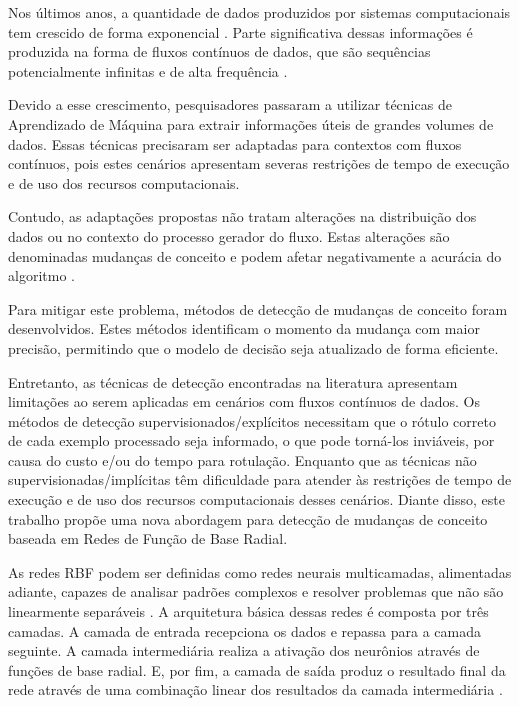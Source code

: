 \documentclass[msc, classic, a4paper]{ufbathesis}
\begin{document}
Nos últimos anos, a quantidade de dados produzidos por sistemas computacionais tem crescido de forma exponencial \cite{idc_report}.
Parte significativa dessas informações é produzida na forma de fluxos contínuos de dados, que são sequências potencialmente infinitas e de alta frequência \cite{Aggarwal:2006:DSM:1196418}.

Devido a esse crescimento, pesquisadores passaram a utilizar técnicas de Aprendizado de Máquina para extrair informações úteis de grandes volumes de dados.
Essas técnicas precisaram ser adaptadas para contextos com fluxos contínuos, pois estes cenários apresentam severas restrições de tempo de execução e de uso dos recursos computacionais.

Contudo, as adaptações propostas não tratam alterações na distribuição dos dados ou no contexto do processo gerador do fluxo.
Estas alterações são denominadas mudanças de conceito e podem afetar negativamente a acurácia do algoritmo \cite{Gama:2014:SCD:2597757.2523813}.

Para mitigar este problema, métodos de detecção de mudanças de conceito foram desenvolvidos.
Estes métodos identificam o momento da mudança com maior precisão, permitindo que o modelo de decisão seja atualizado de forma eficiente.

Entretanto, as técnicas de detecção encontradas na literatura apresentam limitações ao serem aplicadas em cenários com fluxos contínuos de dados.
Os métodos de detecção supervisionados/explícitos necessitam que o rótulo correto de cada exemplo processado seja informado, o que pode torná-los inviáveis, por causa do custo e/ou do tempo para rotulação.
Enquanto que as técnicas não supervisionadas/implícitas têm dificuldade para atender às restrições de tempo de execução e de uso dos recursos computacionais desses cenários.
Diante disso, este trabalho propõe uma nova abordagem para detecção de mudanças de conceito baseada em Redes de Função de Base Radial.

As redes RBF podem ser definidas como redes neurais multicamadas, alimentadas adiante, capazes de analisar padrões complexos e resolver problemas que não são linearmente separáveis \cite{Braga:RedesNeuraisTeoriaAplicacoes}.
A arquitetura básica dessas redes é composta por três camadas.
A camada de entrada recepciona os dados e repassa para a camada seguinte.
A camada intermediária realiza a ativação dos neurônios através de funções de base radial.
E, por fim, a camada de saída produz o resultado final da rede através de uma combinação linear dos resultados da camada intermediária \cite{Rojas:1996:NNS:235222}.
\end{document}
